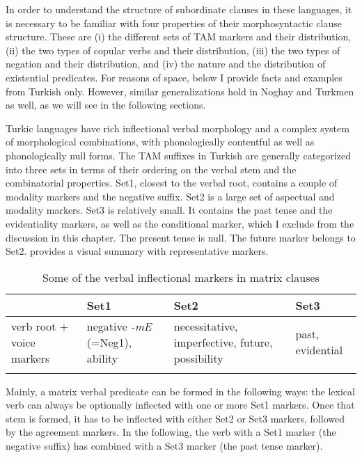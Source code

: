 \documentclass[output=paper]{langsci/langscibook}
\begin{document}
In order to understand the structure of subordinate clauses in these languages, 
it is necessary to be familiar with four properties of their morphosyntactic clause structure. 
These are 
(i) the different sets of TAM markers and their distribution, 
(ii) the two types of copular verbs and their distribution, 
(iii) the two types of negation and their distribution, and 
(iv) the nature and the distribution of existential predicates. 
For reasons of space, below I provide facts and examples from Turkish only. 
However, similar generalizations hold in Noghay and Turkmen as well, as we will see in the following sections.

Turkic languages have rich inflectional verbal morphology and a complex system of morphological combinations, 
with phonologically contentful as well as phonologically null forms. 
The TAM suffixes in Turkish are generally categorized into three sets in terms of their ordering on the verbal stem and the combinatorial properties. 
Set1, closest to the verbal root, contains a couple of modality markers and the negative suffix. 
Set2 is a large set of aspectual and modality markers. 
Set3 is relatively small. 
It contains the past tense and the evidentiality markers, as well as the conditional marker, which I exclude from the discussion in this chapter. 
The present tense is null. 
The future marker belongs to Set2. 
 provides a visual summary with representative markers.

\begin{table}
    \begin{tabularx}{\textwidth}{QQQQ}
        \lsptoprule
        {} & {Set1} & {Set2} & {Set3} \\
        \midrule
        verb root \newline +\,voice markers & 
        negative \textit{-mE} \newline (=Neg1), \newline ability &
        necessitative, \newline imperfective, \newline future, \newline possibility &
        past, \newline evidential \\
        \lspbottomrule
    \end{tabularx}
    \caption{Some of the verbal inflectional markers in matrix clauses}
    \label{kelepirtab:key:1}
\end{table}

Mainly, a matrix verbal predicate can be formed in the following ways: 
the lexical verb can always be optionally inflected with one or more Set1 markers. 
Once that stem is formed, it has to be inflected with either Set2 or Set3 markers, followed by the agreement markers. 
In the following, the verb with a Set1 marker (the negative suffix) has combined with a Set3 marker (the past tense marker).
\end{document}
